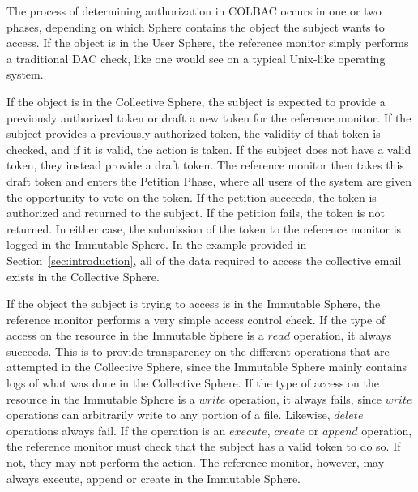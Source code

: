 The process of determining authorization in COLBAC occurs in one or two phases,
depending on which Sphere contains the object the subject wants to access.
If the object is in the User Sphere, the reference monitor simply performs a
traditional DAC check, like one would see on a typical Unix-like operating
system.

If the object is in the Collective Sphere, the subject is expected to
provide a previously authorized token or draft a new token for the reference
monitor. If the subject provides a previously authorized token, the validity of
that token is checked, and if it is valid, the action is taken. If the subject
does not have a valid token, they instead provide a draft token. The reference
monitor then takes this draft token and enters the Petition Phase, where all
users of the system are given the opportunity to vote on the token. If the
petition succeeds, the token is authorized and returned to the subject. If the
petition fails, the token is not returned. In either case, the submission of the
token to the reference monitor is logged in the Immutable Sphere. In the example
provided in Section~\ref{sec:introduction}, all of the data required to access
the collective email exists in the Collective Sphere.

If the object the subject is trying to access is in the Immutable Sphere, the
reference monitor performs a very simple access control check. If the type of
access on the resource in the Immutable Sphere is a $read$ operation, it always
succeeds. This is to provide transparency on the different operations that are
attempted in the Collective Sphere, since the Immutable Sphere mainly contains
logs of what was done in the Collective Sphere. If the type of access on the
resource in the Immutable Sphere is a $write$ operation, it always fails, since
$write$ operations can arbitrarily write to any portion of a file. Likewise,
$delete$ operations always fail. If the operation is an $execute$, $create$ or
$append$ operation, the reference monitor must check that the subject has a
valid token to do so. If not, they may not perform the action. The reference
monitor, however, may always execute, append or create in the Immutable Sphere.


